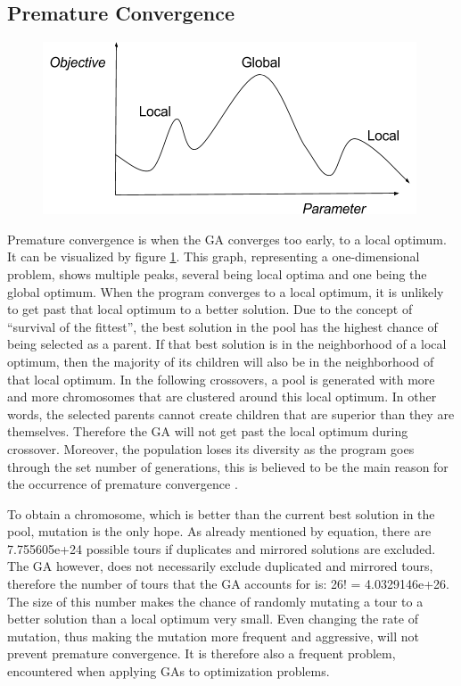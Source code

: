 \subsection{Premature Convergence}

\par

\begin{figure}
			\includegraphics[trim = {0 0 5mm 0}, clip, scale = 0.5]{PrematureConvergence}
	\label{PrematureConvergence}
\end{figure}

Premature convergence is when the GA converges too early, to a local optimum.
It can be visualized by figure \ref{PrematureConvergence}. This graph, representing a one-dimensional problem, shows multiple peaks, several being local optima and one being the global optimum. When the program converges to a local optimum, it is unlikely to get past that local optimum to a better solution. Due to the concept of “survival of the fittest”, the best solution in the pool has the highest chance of being selected as a parent. If that best solution is in the neighborhood of a local optimum, then the majority of its children will also be in the neighborhood of that local optimum. In the following crossovers, a pool is generated with more and more chromosomes that are clustered around this local optimum. In other words, the selected parents cannot create children that are superior than they are themselves. Therefore the GA will not get past the local optimum during crossover. Moreover, the population loses its diversity as the program goes through the set number of generations, this is believed to be the main reason for the occurrence of premature convergence \cite{Premconvergence}\cite{Popdiv}\cite{Congress}.

\par
To obtain a chromosome, which is better than the current best solution in the pool, mutation is the only hope. As already mentioned by equation, there are 7.755605e+24 possible tours if duplicates and mirrored solutions are excluded. The GA however, does not necessarily exclude duplicated and mirrored tours, therefore the number of tours that the GA accounts for is: 26! = 4.0329146e+26. The size of this number makes the chance of randomly mutating a tour to a better solution than a local optimum very small. Even changing the rate of mutation, thus making the mutation more frequent and aggressive, will not prevent premature convergence. It is therefore also a frequent problem, encountered when applying GAs to optimization problems. 

